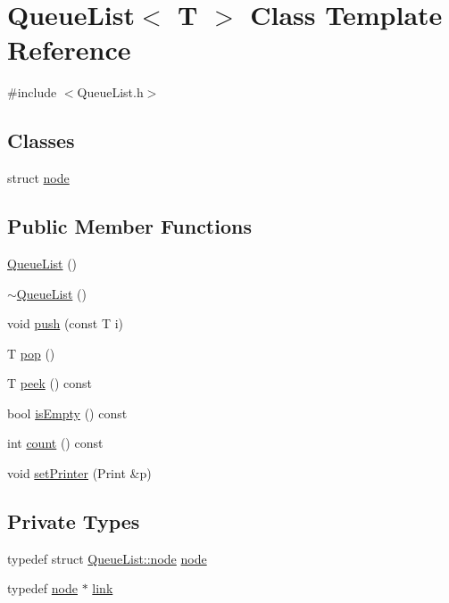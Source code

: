 \hypertarget{class_queue_list}{}\section{Queue\+List$<$ T $>$ Class Template Reference}
\label{class_queue_list}


{\ttfamily \#include $<$Queue\+List.\+h$>$}

\subsection*{Classes}
\begin{DoxyCompactItemize}
\item 
struct \mbox{\hyperlink{struct_queue_list_1_1node}{node}}
\end{DoxyCompactItemize}
\subsection*{Public Member Functions}
\begin{DoxyCompactItemize}
\item 
\mbox{\hyperlink{class_queue_list_acdba0c9151f33fab7a805e49e8a4c52e}{Queue\+List}} ()
\item 
\mbox{\hyperlink{class_queue_list_a6090ecbc97b1528ef41422cb922bd92e}{$\sim$\+Queue\+List}} ()
\item 
void \mbox{\hyperlink{class_queue_list_a47c26444335b418138450ba8bfb5ba13}{push}} (const T i)
\item 
T \mbox{\hyperlink{class_queue_list_abf5fba15da77e79d28cb3f593f5fd0a7}{pop}} ()
\item 
T \mbox{\hyperlink{class_queue_list_aef76da8fe3b8bef765ccdddb18f998b3}{peek}} () const
\item 
bool \mbox{\hyperlink{class_queue_list_a827e0fc95c2dfcf5fe5313b25afef3e5}{is\+Empty}} () const
\item 
int \mbox{\hyperlink{class_queue_list_a3e3f39c0736cd879330ec4f04e3de504}{count}} () const
\item 
void \mbox{\hyperlink{class_queue_list_a2497b59c53aec471ec68f9d604e693ac}{set\+Printer}} (Print \&p)
\end{DoxyCompactItemize}
\subsection*{Private Types}
\begin{DoxyCompactItemize}
\item 
typedef struct \mbox{\hyperlink{struct_queue_list_1_1node}{Queue\+List\+::node}} \mbox{\hyperlink{class_queue_list_a62281a4a1d5fd02f370c6dcae94559fe}{node}}
\item 
typedef \mbox{\hyperlink{struct_queue_list_1_1node}{node}} $\ast$ \mbox{\hyperlink{class_queue_list_a2dbbea18dafe3bc1585072a26cee8e68}{link}}
\end{DoxyCompactItemize}
